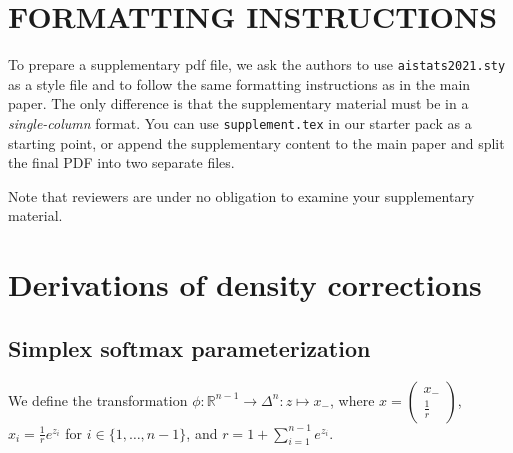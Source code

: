 \documentclass[twoside]{article}
\begin{document}
%

%

\onecolumn
{}

\section{FORMATTING INSTRUCTIONS}

To prepare a supplementary pdf file, we ask the authors to use \texttt{aistats2021.sty} as a style file and to follow the same formatting instructions as in the main paper.
The only difference is that the supplementary material must be in a \emph{single-column} format.
You can use \texttt{supplement.tex} in our starter pack as a starting point, or append the supplementary content to the main paper and split the final PDF into two separate files.

Note that reviewers are under no obligation to examine your supplementary material.

\section{Derivations of density corrections}

\subsection{Simplex softmax parameterization}

We define the transformation $\phi: \mathbb{R}^{n-1} \to \Delta^{n}: z \mapsto x_-$, where $x=\begin{pmatrix}x_- \\ \frac{1}{r}\end{pmatrix}$, $x_i = \frac{1}{r} e^{z_i}$ for $i \in \{1, \ldots, n-1\}$, and $r = 1 + \sum_{i=1}^{n-1} e^{z_i}$.
\end{document}
